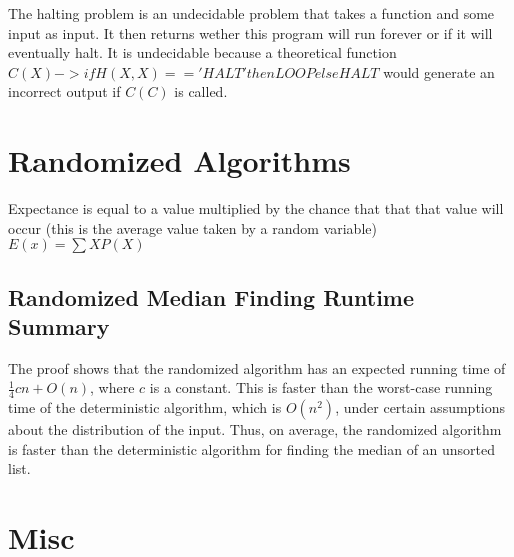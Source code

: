 \documentclass{article}
\begin{document}
The halting problem is an undecidable problem that takes a function and some input as input. It then returns
wether this program will run forever or if it will eventually halt. It is undecidable because a theoretical
function $C(X) -> if H(X,X) == 'HALT' then LOOP else HALT$ would generate an incorrect output if $C(C)$ is called.


\section{Randomized Algorithms}
Expectance is equal to a value multiplied by the chance that that that value will occur
(this is the average value taken by a random variable)$E(x) = \sum XP(X)$


\subsection{Randomized Median Finding Runtime Summary}
The proof shows that the randomized algorithm has an expected running time of $\frac{1}{4}cn + O(n)$, where $c$ is a constant. This is faster than the worst-case running time of the deterministic algorithm, which is $O(n^2)$, under certain assumptions about the distribution of the input. Thus, on average, the randomized algorithm is faster than the deterministic algorithm for finding the median of an unsorted list.


\section{Misc}
\end{document}
